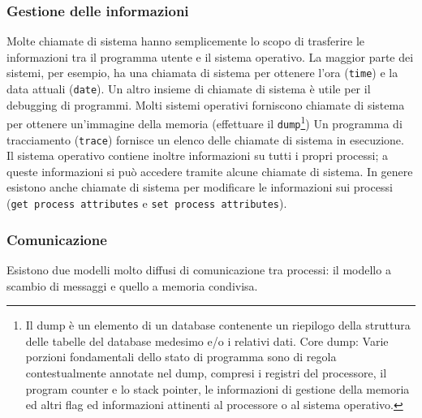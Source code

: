 \documentclass[11pt,a4paper]{article}
\begin{document}
\subsubsection{Gestione delle informazioni}
Molte chiamate di sistema hanno semplicemente lo scopo di trasferire le informazioni tra il
programma utente e il sistema operativo. La maggior parte dei sistemi, per esempio, ha una
chiamata di sistema per ottenere l'ora (\texttt{time}) e la data attuali (\texttt{date}).
Un altro insieme di chiamate di sistema è utile per il debugging di programmi. Molti
sistemi operativi forniscono chiamate di sistema per ottenere un'immagine della memoria
(effettuare il \texttt{dump}\footnote{Il dump è un elemento di un database contenente un riepilogo della struttura delle tabelle del database medesimo e/o i relativi dati. Core dump: Varie porzioni fondamentali dello stato di programma sono di regola contestualmente annotate nel dump, compresi i registri del processore, il program counter e lo stack pointer, le informazioni di gestione della memoria ed altri flag ed informazioni attinenti al processore o al sistema operativo.})
Un programma di traccia­mento (\texttt{trace}) fornisce un elenco delle chiamate di sistema in esecuzione.\\
Il sistema operativo contiene inoltre informazioni su tutti i propri processi; a queste in­formazioni si può accedere tramite alcune chiamate di sistema. In genere esistono anche chia­mate di sistema per modificare le informazioni sui processi (\texttt{get process attributes} e \texttt{set process attributes}).

\subsubsection{Comunicazione}
Esistono due modelli molto diffusi di comunicazione tra processi: il modello a scambio di
messaggi e quello a memoria condivisa.
\end{document}
